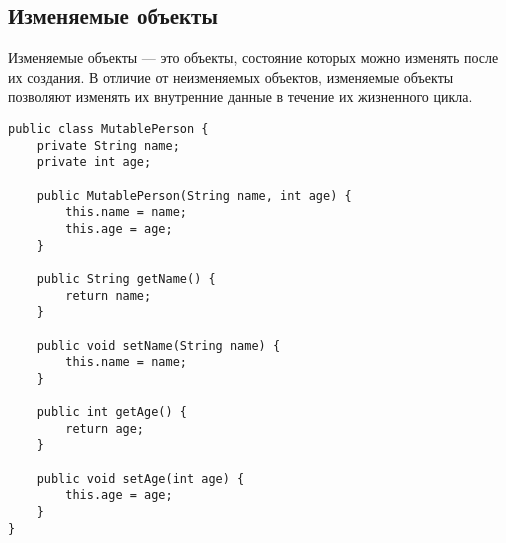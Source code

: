 \subsection{Изменяемые объекты}
Изменяемые объекты — это объекты, состояние которых можно изменять после их создания. В отличие от неизменяемых объектов, изменяемые объекты позволяют изменять их внутренние данные в течение их жизненного цикла.

\begin{verbatim}
public class MutablePerson {
    private String name;
    private int age;

    public MutablePerson(String name, int age) {
        this.name = name;
        this.age = age;
    }

    public String getName() {
        return name;
    }

    public void setName(String name) {
        this.name = name;
    }

    public int getAge() {
        return age;
    }

    public void setAge(int age) {
        this.age = age;
    }
}
\end{verbatim}

